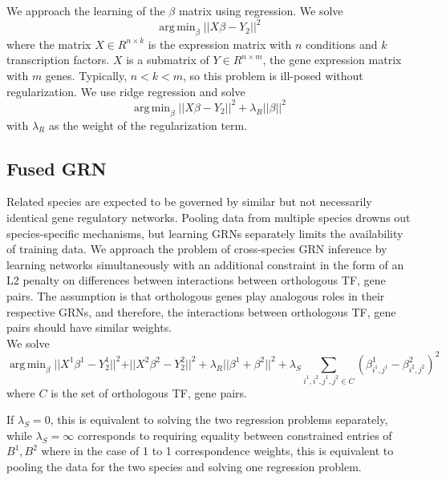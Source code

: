 \documentclass[11pt]{article}
\DeclareMathOperator*{\argmin}{arg\,min}
\begin{document}
\noindent We approach the learning of the $\beta$ matrix using regression. We solve
\begin{equation}
\argmin_\beta\vert \vert X\beta - Y_2 \vert \vert ^2
\end{equation}
where the matrix $X \in R^{n \times k}$ is the expression matrix with $n$ conditions and $k$ transcription factors. $X$ is a submatrix of $Y \in R^{n \times m}$, the gene expression matrix with $m$ genes. Typically, $n < k < m$, so this problem is ill-posed without regularization. We use ridge regression and solve
\begin{equation}
\argmin_\beta\vert \vert X\beta - Y_2 \vert \vert ^2 + \lambda_R \vert \vert \beta \vert \vert ^2
\end{equation} 
with $\lambda_R$ as the weight of the regularization term.

\subsection{Fused GRN}
Related species are expected to be governed by similar but not necessarily identical gene regulatory networks. Pooling data from multiple species drowns out species-specific mechanisms, but learning GRNs separately limits the availability of training data. We approach the problem of cross-species GRN inference by learning networks simultaneously with an additional constraint in the form of an L2 penalty on differences between interactions between orthologous TF, gene pairs. The assumption is that orthologous genes play analogous roles in their respective GRNs, and therefore, the interactions between orthologous TF, gene pairs should have similar weights. \\

We solve
\begin{equation}
\argmin_\beta \vert \vert X^1 \beta^1 - Y_2 ^1 \vert \vert ^2 + \vert \vert X^2 \beta^2 - Y_2 ^2 \vert \vert ^2 + \lambda_R \vert \vert \beta^1 + \beta^2 \vert \vert ^2 + \lambda_S \sum\limits_{i^1, i^2, j^1, j^2 \in C} (\beta^1_{i^1,j^1} - \beta^2_{i^2,j^2})^2
\end{equation}
where $C$ is the set of orthologous TF, gene pairs.\newline

If $\lambda_S = 0$, this is equivalent to solving the two regression problems separately, while $\lambda_S = \infty$ corresponds to requiring equality between constrained entries of $B^1, B^2$ where in the case of 1 to 1 correspondence weights, this is equivalent to pooling the data for the two species and solving one regression problem. \\
\end{document}
